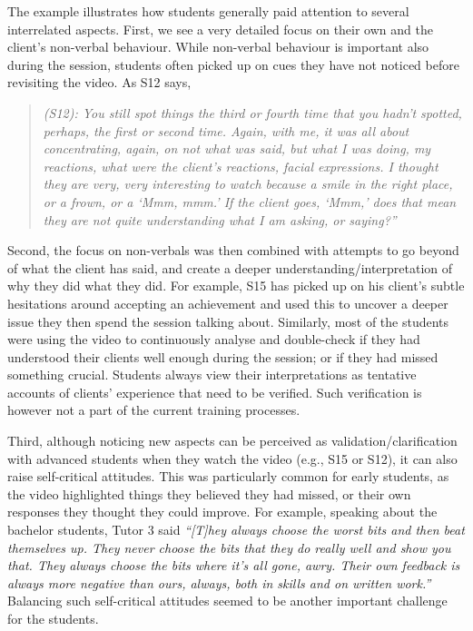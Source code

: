 \documentclass{sigchi}
\newcommand{\qq}[2]{\textrm{\textit{``#2''}}}
\begin{document}
The example illustrates how students generally paid attention to several interrelated aspects. First, we see a very detailed focus on their own and the client's non-verbal behaviour. While non-verbal behaviour is important also during the session, students often picked up on cues they have not noticed before revisiting the video. As S12 says, 	


\begin{quotation}
{\itshape
\noindent 
(S12): You still spot things the third or fourth time that you hadn't spotted, perhaps, the first or second time. Again, with me, it was all about concentrating, again, on not what was said, but what I was doing, my reactions, what were the client's reactions, facial expressions. I thought they are very, very interesting to watch because a smile in the right place, or a frown, or a `Mmm, mmm.' If the client goes, `Mmm,' does that mean they are not quite understanding what I am asking, or saying?'' 
}
\end{quotation} 

Second, the focus on non-verbals was then combined with attempts to go beyond of what the client has said, and create a deeper understanding/interpretation of why they did what they did. For example, S15 has picked up on his client's subtle hesitations around accepting an achievement and used this to uncover a deeper issue they then spend the session talking about. Similarly, most of the students were using the video to continuously analyse and double-check if they had understood their clients well enough during the session; or if they had missed something crucial. Students always view their interpretations as tentative accounts of clients' experience that need to be verified. Such verification is however not a part of the current training processes.

Third, although noticing new aspects can be perceived as validation/clarification with advanced students when they watch the video (e.g., S15 or S12), it can also raise self-critical attitudes. This was particularly common for early students, as the video highlighted things they believed they had missed, or their own responses they thought they could improve. For example, speaking about the bachelor students, Tutor 3 said \qq{}{[T]hey always choose the worst bits and then beat themselves up. They never choose the bits that they do really well and show you that. They always choose the bits where it's all gone, awry. Their own feedback is always more negative than ours, always, both in skills and on written work.} Balancing such self-critical attitudes seemed to be another important challenge for the students. 
\end{document}
